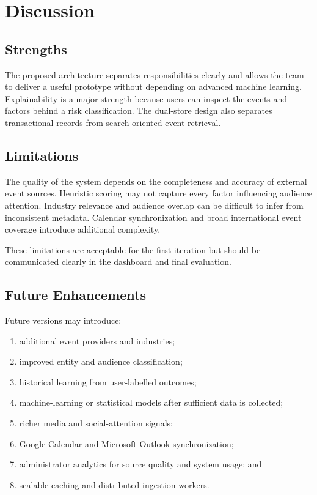 \documentclass[12pt]{article}
\begin{document}
\section{Discussion}

\subsection{Strengths}
The proposed architecture separates responsibilities clearly and allows the team to deliver a useful prototype without depending on advanced machine learning. Explainability is a major strength because users can inspect the events and factors behind a risk classification. The dual-store design also separates transactional records from search-oriented event retrieval.

\subsection{Limitations}
The quality of the system depends on the completeness and accuracy of external event sources. Heuristic scoring may not capture every factor influencing audience attention. Industry relevance and audience overlap can be difficult to infer from inconsistent metadata. Calendar synchronization and broad international event coverage introduce additional complexity.

These limitations are acceptable for the first iteration but should be communicated clearly in the dashboard and final evaluation.

\subsection{Future Enhancements}
Future versions may introduce:
\begin{enumerate}[leftmargin=0.7cm]
\item additional event providers and industries;
\item improved entity and audience classification;
\item historical learning from user-labelled outcomes;
\item machine-learning or statistical models after sufficient data is collected;
\item richer media and social-attention signals;
\item Google Calendar and Microsoft Outlook synchronization;
\item administrator analytics for source quality and system usage; and
\item scalable caching and distributed ingestion workers.
\end{enumerate}
\end{document}
